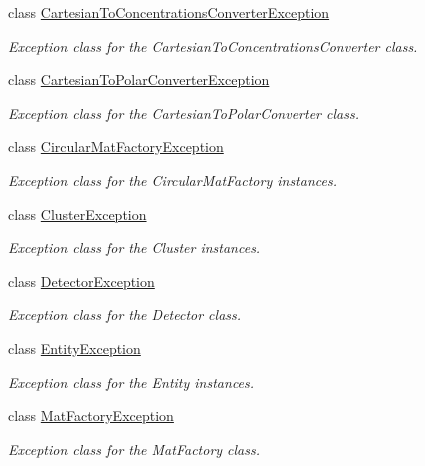 \begin{DoxyCompactItemize}
\item 
class \hyperlink{classmultiscale_1_1CartesianToConcentrationsConverterException}{Cartesian\-To\-Concentrations\-Converter\-Exception}
\begin{DoxyCompactList}\small\item\em Exception class for the Cartesian\-To\-Concentrations\-Converter class. \end{DoxyCompactList}\item 
class \hyperlink{classmultiscale_1_1CartesianToPolarConverterException}{Cartesian\-To\-Polar\-Converter\-Exception}
\begin{DoxyCompactList}\small\item\em Exception class for the Cartesian\-To\-Polar\-Converter class. \end{DoxyCompactList}\item 
class \hyperlink{classmultiscale_1_1CircularMatFactoryException}{Circular\-Mat\-Factory\-Exception}
\begin{DoxyCompactList}\small\item\em Exception class for the Circular\-Mat\-Factory instances. \end{DoxyCompactList}\item 
class \hyperlink{classmultiscale_1_1ClusterException}{Cluster\-Exception}
\begin{DoxyCompactList}\small\item\em Exception class for the Cluster instances. \end{DoxyCompactList}\item 
class \hyperlink{classmultiscale_1_1DetectorException}{Detector\-Exception}
\begin{DoxyCompactList}\small\item\em Exception class for the Detector class. \end{DoxyCompactList}\item 
class \hyperlink{classmultiscale_1_1EntityException}{Entity\-Exception}
\begin{DoxyCompactList}\small\item\em Exception class for the Entity instances. \end{DoxyCompactList}\item 
class \hyperlink{classmultiscale_1_1MatFactoryException}{Mat\-Factory\-Exception}
\begin{DoxyCompactList}\small\item\em Exception class for the Mat\-Factory class. \end{DoxyCompactList}\item 

\end{DoxyCompactItemize}
